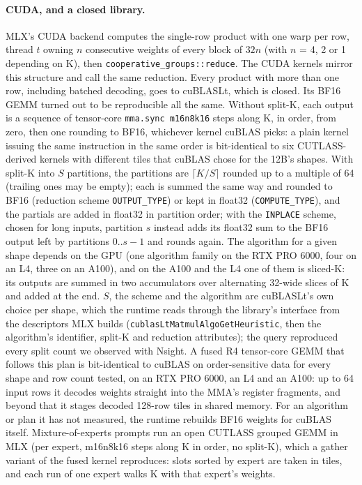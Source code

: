 \documentclass[11pt]{article}
\begin{document}
\paragraph{CUDA, and a closed library.} MLX's CUDA backend computes the single-row product with one warp per row, thread $t$ owning $n$ consecutive weights of every block of $32n$ (with $n$ = 4, 2 or 1 depending on K), then \texttt{cooperative\_groups::reduce}. The CUDA kernels mirror this structure and call the same reduction. Every product with more than one row, including batched decoding, goes to cuBLASLt, which is closed. Its BF16 GEMM turned out to be reproducible all the same. Without split-K, each output is a sequence of tensor-core \texttt{mma.sync m16n8k16} steps along K, in order, from zero, then one rounding to BF16, whichever kernel cuBLAS picks: a plain kernel issuing the same instruction in the same order is bit-identical to six CUTLASS-derived kernels with different tiles that cuBLAS chose for the 12B's shapes. With split-K into $S$ partitions, the partitions are $\lceil K/S \rceil$ rounded up to a multiple of 64 (trailing ones may be empty); each is summed the same way and rounded to BF16 (reduction scheme \texttt{OUTPUT\_TYPE}) or kept in float32 (\texttt{COMPUTE\_TYPE}), and the partials are added in float32 in partition order; with the \texttt{INPLACE} scheme, chosen for long inputs, partition $s$ instead adds its float32 sum to the BF16 output left by partitions $0..s-1$ and rounds again. The algorithm for a given shape depends on the GPU (one algorithm family on the RTX PRO 6000, four on an L4, three on an A100), and on the A100 and the L4 one of them is sliced-K: its outputs are summed in two accumulators over alternating 32-wide slices of K and added at the end. $S$, the scheme and the algorithm are cuBLASLt's own choice per shape, which the runtime reads through the library's interface from the descriptors MLX builds (\texttt{cublasLtMatmulAlgoGetHeuristic}, then the algorithm's identifier, split-K and reduction attributes); the query reproduced every split count we observed with Nsight. A fused R4 tensor-core GEMM that follows this plan is bit-identical to cuBLAS on order-sensitive data for every shape and row count tested, on an RTX PRO 6000, an L4 and an A100: up to 64 input rows it decodes weights straight into the MMA's register fragments, and beyond that it stages decoded 128-row tiles in shared memory. For an algorithm or plan it has not measured, the runtime rebuilds BF16 weights for cuBLAS itself. Mixture-of-experts prompts run an open CUTLASS grouped GEMM in MLX (per expert, m16n8k16 steps along K in order, no split-K), which a gather variant of the fused kernel reproduces: slots sorted by expert are taken in tiles, and each run of one expert walks K with that expert's weights.
\end{document}
